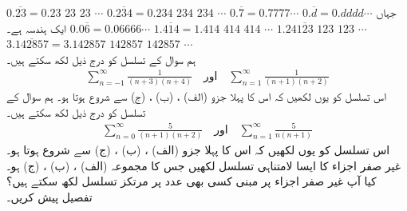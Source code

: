$0.\overline{23}=0.23\,\,23\,\,23\,\,\cdots$
$0.\overline{234}=0.234\,\,234\,\,234\,\,\cdots$
$0.\overline{7}=0.7777\cdots$
$0.\overline{d}=0.dddd\cdots$\quad
جہاں  ایک ہندسہ ہے۔
$0.0\overline{6}=0.06666\cdots$
$1.\overline{414}=1.414\,\,414\,\,414\,\,\cdots$
$1.24\overline{123}\,\,123\,\,123\,\,\cdots$
$3.\overline{142857}=3.142857\,\,142857\,\,142857\,\,\cdots$
\\
ہم سوال  کے تسلسل کو درج ذیل لکھ سکتے ہیں۔
\begin{align*}
\sum_{n=-1}^{\infty}\frac{1}{(n+3)(n+4)}\quad \text{اور}\quad  \sum\limits_{n=1}^{\infty}\frac{1}{(n+1)(n+2)}
\end{align*}
اس تسلسل کو یوں لکھیں کہ اس کا پہلا جزو (الف) ، (ب) ، (ج)  سے شروع ہوتا ہو۔ 
ہم سوال  کے تسلسل کو درج ذیل لکھ سکتے ہیں۔
\begin{align*}
\sum_{n=0}^{\infty}\frac{5}{(n+1)(n+2)}\quad\text{اور} \quad  \sum_{n=1}^{\infty}\frac{5}{n(n+1)}
\end{align*}
اس تسلسل کو یوں لکھیں کہ اس کا پہلا جزو (الف) ، (ب) ، (ج)  سے شروع ہوتا ہو۔
غیر صفر اجزاء کا ایسا لامتناہی تسلسل لکھیں جس کا مجموعہ (الف) ، (ب) ، (ج)  ہو۔ کیا آپ غیر صفر اجزاء پر مبنی کسی بھی عدد پر مرتکز تسلسل لکھ سکتے ہیں؟ تفصیل پیش کریں۔
